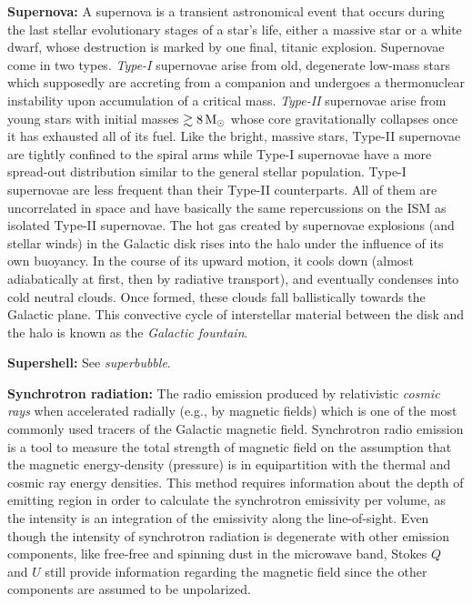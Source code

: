 \documentclass[a4paper,10pt]{article}
\begin{document}
{\noindent}\textbf{Supernova:} A supernova is a transient astronomical event that occurs during the last stellar evolutionary stages of a star's life, either a massive star or a white dwarf, whose destruction is marked by one final, titanic explosion. Supernovae come in two types. \textit{Type-I} supernovae arise from old, degenerate low-mass stars which supposedly are accreting from a companion and undergoes a thermonuclear instability upon accumulation of a critical mass. \textit{Type-II} supernovae arise from young stars with initial masses $\gtrsim8\,{\rm M}_\odot$ whose core gravitationally collapses once it has exhausted all of its fuel. Like the bright, massive stars, Type-II supernovae are tightly confined to the spiral arms while Type-I supernovae have a more spread-out distribution similar to the general stellar population. Type-I supernovae are less frequent than their Type-II counterparts. All of them are uncorrelated in space and have basically the same repercussions on the ISM as isolated Type-II supernovae. The hot gas created by supernovae explosions (and stellar winds) in the Galactic disk rises into the halo under the influence of its own buoyancy. In the course of its upward motion, it cools down (almost adiabatically at first, then by radiative transport), and eventually condenses into cold neutral clouds. Once formed, these clouds fall ballistically towards the Galactic plane. This convective cycle of interstellar material between the disk and the halo is known as the \textit{Galactic fountain}.

{\noindent}\textbf{Supershell:} See \textit{superbubble}.

{\noindent}\textbf{Synchrotron radiation:} The radio emission produced by relativistic \textit{cosmic rays} when accelerated radially (e.g., by magnetic fields) which is one of the most commonly used tracers of the Galactic magnetic field. Synchrotron radio emission is a tool to measure the total strength of magnetic field on the assumption that the magnetic energy-density (pressure) is in equipartition with the thermal and cosmic ray energy densities. This method requires information about the depth of emitting region in order to calculate the synchrotron emissivity per volume, as the intensity is an integration of the emissivity along the line-of-sight. Even though the intensity of synchrotron radiation is degenerate with other emission components, like free-free and spinning dust in the microwave band, Stokes $Q$ and $U$ still provide information regarding the magnetic field since the other components are assumed to be unpolarized.
\end{document}
